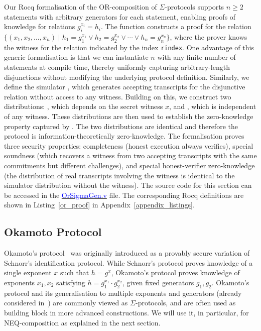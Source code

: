 \documentclass[sigconf,anonymous,review]{acmart}
\begin{document}
Our Rocq formalisation of the OR-composition of $\Sigma$-protocols supports $n \geq 2$ statements with arbitrary generators for each statement, enabling proofs of knowledge for relations $g_i^{x_i} = h_i$. The function \texttt{} constructs a proof for the relation
$\{ (x_1, x_2, \ldots, x_n) \mid h_1 = g_1^{x_1} \lor h_2 = g_2^{x_2} \lor \cdots \lor h_n = g_n^{x_n} \}$, 
where the prover knows the witness for the relation indicated by the index \texttt{rindex}. One advantage of this generic formalisation is that we can instantiate \( n \) with any finite number of statements at compile time, thereby uniformly capturing arbitrary-length disjunctions without modifying the underlying protocol definition.  Similarly, we define the simulator \texttt{}, which generates accepting transcripts for the disjunctive relation without access to any witness. Building on this, we construct two distributions: \texttt{}, which depends on the secret witness \(x\), and \texttt{}, which is independent of any witness. These distributions are then used to establish the zero-knowledge property captured by \texttt{}. The two distributions are identical and therefore the protocol is information-theoretically zero-knowledge. The formalisation proves three security properties: completeness (honest execution always verifies), special soundness (which recovers a witness from two accepting transcripts with the same commitments but different challenges), and special honest-verifier zero-knowledge (the distribution of real transcripts involving the witness is identical to the simulator distribution without the witness). The source code for this section can be accessed in the \href{https://anonymous.4open.science/r/SigmaProtocol-EBA5/src/Crypto/OrSigmaGen.v}{\textcolor{blue}{OrSigmaGen.v}} file. The corresponding Rocq definitions are shown in Listing~\ref{or_proof} in Appendix~\ref{appendix_listings}.



\subsection{Okamoto Protocol}

Okamoto's protocol~\cite[Identification scheme 1]{okamoto1992provably} was originally introduced as a provably secure variation of Schnorr's identification protocol.
While Schnorr's protocol proves knowledge of a single exponent $x$ such that $h = g^x$, Okamoto's protocol proves knowledge of 
exponents $x_1, x_2$ satisfying $h = g_1^{x_1} \cdot g_2^{x_2}$, given fixed generators $g_1,g_2$. Okamoto's protocol and its generalisation to multiple exponents and generators
(already considered in~\cite{10.1007/3-540-39118-5_13}) are commonly viewed as $\Sigma$-protocols, and are often used as building block in more advanced constructions.
We will use it, in particular, for NEQ-composition as explained in the next section.
\end{document}
